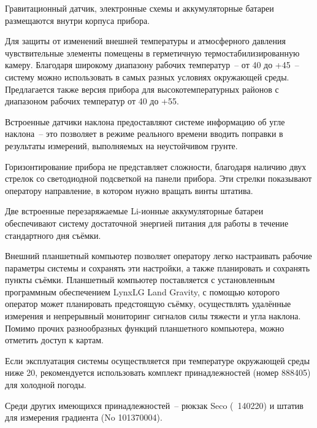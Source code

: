 Гравитационный датчик, электронные схемы и аккумуляторные батареи размещаются
внутри корпуса прибора.

Для защиты от изменений внешней температуры и атмосферного давления
чувствительные элементы \cg{} помещены в герметичную
термостабилизированную камеру. Благодаря широкому диапазону рабочих
температур~-- от \textminus{}40\textcelsius{} до +45\textcelsius{}~-- систему
\cg{} можно использовать в самых разных условиях окружающей
среды. Предлагается также версия прибора для высокотемпературных районов с
диапазоном рабочих температур от \textminus{}40\textcelsius{} до
+55\textcelsius{}.

Встроенные датчики наклона предоставляют системе \cg{}
информацию об угле наклона~-- это позволяет в режиме реального времени вводить
поправки в результаты измерений, выполняемых на неустойчивом грунте.

Горизонтирование прибора \cg{} не представляет сложности,
благодаря наличию двух стрелок со светодиодной подсветкой на панели прибора. Эти
стрелки показывают оператору направление, в котором нужно вращать винты штатива.

Две встроенные перезаряжаемые Li-ионные аккумуляторные батареи обеспечивают
систему \cg{} достаточной энергией питания для работы в
течение стандартного дня съёмки.

Внешний планшетный компьютер позволяет оператору легко настраивать рабочие
параметры системы \cg{} и сохранять эти настройки, а также
планировать и сохранять пункты съёмки. Планшетный компьютер поставляется с
установленным программным обеспечением LynxLG Land Gravity, с помощью
которого оператор может планировать предстоящую съёмку, осуществлять
удалённые измерения и непрерывный мониторинг сигналов силы тяжести и угла
наклона. Помимо прочих разнообразных функций планшетного компьютера, можно
отметить доступ к картам.

Если эксплуатация системы осуществляется при температуре окружающей среды ниже
\textminus{}20\textcelsius{}, рекомендуется использовать комплект
принадлежностей (номер 888405) для холодной погоды.

Среди других имеющихся принадлежностей~-- рюкзак Seco (\textnumero{}~140220) и
штатив для измерения градиента (No 101370004).
